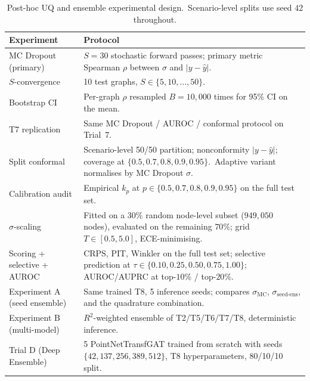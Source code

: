 \begin{table}[htbp]
\centering
\caption[Post-hoc and ensemble experimental design]{Post-hoc UQ and ensemble experimental design.\ Scenario-level splits use seed $42$ throughout.}
\label{tab:exp_design}
\footnotesize
\setlength{\tabcolsep}{4pt}
\renewcommand{\arraystretch}{1.15}
\begin{tabular}{p{3.7cm}p{8.2cm}}
\toprule
\textbf{Experiment} & \textbf{Protocol} \\
\midrule
MC Dropout (primary)\label{sec:mc_design} & $S = 30$ stochastic forward passes; primary metric Spearman $\rho$ between $\sigma$ and $|y - \hat y|$. \\
$S$-convergence\label{sec:s_conv_design} & 10 test graphs, $S \in \{5, 10, \dots, 50\}$. \\
Bootstrap CI\label{sec:bootstrap_design} & Per-graph $\rho$ resampled $B = 10{,}000$ times for 95\% CI on the mean. \\
T7 replication\label{sec:t7_design} & Same MC Dropout / AUROC / conformal protocol on Trial~7. \\
Split conformal\label{sec:conformal_design} & Scenario-level 50/50 partition; nonconformity $|y - \hat y|$; coverage at $\{0.5, 0.7, 0.8, 0.9, 0.95\}$.\ Adaptive variant normalises by MC Dropout $\sigma$. \\
Calibration audit\label{sec:calibration_design} & Empirical $k_p$ at $p \in \{0.5, 0.7, 0.8, 0.9, 0.95\}$ on the full test set. \\
$\sigma$-scaling\label{sec:ts_design} & Fitted on a $30\%$ random node-level subset ($949{,}050$ nodes), evaluated on the remaining $70\%$; grid $T \in [0.5, 5.0]$, ECE-minimising. \\
Scoring + selective + AUROC\label{sec:scoring_design} & CRPS, PIT, Winkler on the full test set; selective prediction at $\tau \in \{0.10, 0.25, 0.50, 0.75, 1.00\}$; AUROC/AUPRC at top-$10\%$ / top-$20\%$. \\
\midrule
Experiment A (seed ensemble)\label{sec:expA_design} & Same trained T8, 5 inference seeds; compares $\sigma_\text{MC}$, $\sigma_\text{seed-ens}$, and the quadrature combination. \\
Experiment B (multi-model)\label{sec:expB_design} & $R^2$-weighted ensemble of T2/T5/T6/T7/T8, deterministic inference. \\
Trial D (Deep Ensemble)\label{sec:de_design} & 5 PointNetTransfGAT trained from scratch with seeds $\{42, 137, 256, 389, 512\}$, T8 hyperparameters, 80/10/10 split. \\
\bottomrule
\end{tabular}
\end{table}

